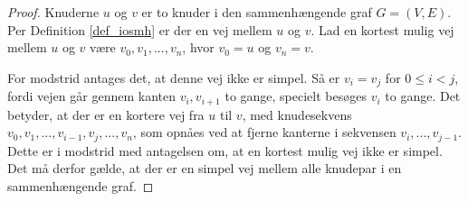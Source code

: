 \begin{proof}
Knuderne $u$ og $v$ er to knuder i den sammenhængende graf $G=(V,E)$.
Per Definition \ref{def_iosmh} er der en vej mellem $u$ og $v$.
Lad en kortest mulig vej mellem $u$ og $v$ være $v_0,v_1,...,v_n$, hvor $v_0=u$ og $v_n=v$.

For modstrid antages det, at denne vej ikke er simpel. 
Så er $v_i=v_j$ for $0 \leq i < j$, fordi vejen går gennem kanten $v_i,v_{i+1}$ to gange, specielt besøges $v_i$ to gange.
Det betyder, at der er en kortere vej fra $u$ til $v$, med knudesekvens $v_0,v_1,...,v_{i-1},v_j,...,v_n$, som opnåes ved at fjerne kanterne i sekvensen $v_i,...,v_{j-1}$.
Dette er i modstrid med antagelsen om, at en kortest mulig vej ikke er simpel.
Det må derfor gælde, at der er en simpel vej mellem alle knudepar i en sammenhængende graf. 
\end{proof}


